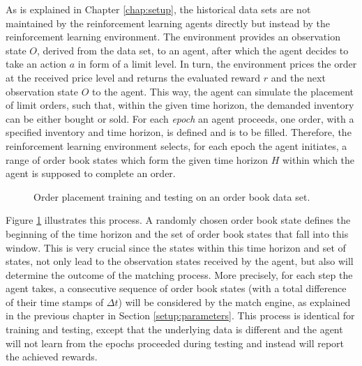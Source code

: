 As is explained in Chapter \ref{chap:setup}, the historical data sets are not maintained by the reinforcement learning agents directly but instead by the reinforcement learning environment.
The environment provides an observation state $O$, derived from the data set, to an agent, after which the agent decides to take an action $a$ in form of a limit level.
In turn, the environment prices the order at the received price level and returns the evaluated reward $r$ and the next observation state $O$ to the agent.
This way, the agent can simulate the placement of limit orders, such that, within the given time horizon, the demanded inventory can be either bought or sold.
For each \textit{epoch} an agent proceeds, one order, with a specified inventory and time horizon, is defined and is to be filled.
Therefore, the reinforcement learning environment selects, for each epoch the agent initiates, a range of order book states which form the given time horizon $H$ within which the agent is supposed to complete an order.
\begin{figure}[H]
    \centering
    \caption{Order placement training and testing on an order book data set.}
    \label{fig:eval-orderbook-window}
\end{figure}
Figure \ref{fig:eval-orderbook-window} illustrates this process.
A randomly chosen order book state defines the beginning of the time horizon and the set of order book states that fall into this window.
This is very crucial since the states within this time horizon and set of states, not only lead to the observation states received by the agent, but also will determine the outcome of the matching process.
More precisely, for each step the agent takes, a consecutive sequence of order book states (with a total difference of their time stamps of $\Delta{t}$) will be considered by the match engine, as explained in the previous chapter in Section \ref{setup:parameters}.
This process is identical for training and testing, except that the underlying data is different and the agent will not learn from the epochs proceeded during testing and instead will report the achieved rewards.

